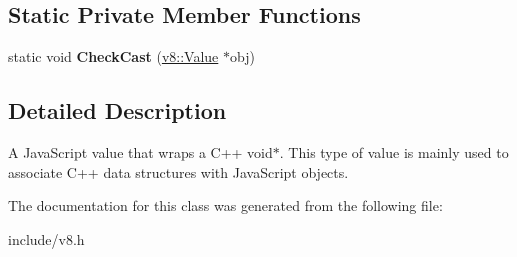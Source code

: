 \subsection*{Static Private Member Functions}
\begin{DoxyCompactItemize}
\item 
static void {\bfseries Check\+Cast} (\hyperlink{classv8_1_1_value}{v8\+::\+Value} $\ast$obj)\hypertarget{classv8_1_1_external_a7b48d794bfa03ee712090a13dbe885ab}{}\label{classv8_1_1_external_a7b48d794bfa03ee712090a13dbe885ab}

\end{DoxyCompactItemize}


\subsection{Detailed Description}
A Java\+Script value that wraps a C++ void$\ast$. This type of value is mainly used to associate C++ data structures with Java\+Script objects. 

The documentation for this class was generated from the following file\+:\begin{DoxyCompactItemize}
\item 
include/v8.\+h\end{DoxyCompactItemize}
